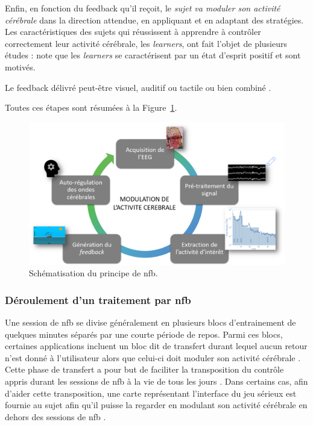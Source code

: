 Enfin, en fonction du feedback qu'il reçoit, le \textit{sujet va moduler son activité cérébrale} dans la direction attendue, en appliquant et en adaptant des stratégies. 
Les caractéristiques des sujets qui réussissent à apprendre à contrôler correctement leur activité cérébrale, les \textit{learners}, ont fait l'objet de plusieurs études : 
\citet{Friedrich2014} note que les \textit{learners} se caractérisent par un état d'esprit positif et sont motivés. 

Le feedback délivré peut-être visuel, auditif ou tactile ou bien combiné \citep{Vernon2004}.

Toutes ces étapes sont résumées à la Figure~\ref{Figure:introduction_nfb_explications}.

\begin{figure}[h!]
  \centering
	\includegraphics[width=1\linewidth]{figures/chapter-1/introduction-nfb-explication} 
  \caption{Schématisation du principe de \gls{nfb}.}
  \label{Figure:introduction_nfb_explications}
\end{figure}

\subsubsection{Déroulement d'un traitement par \gls{nfb}}

Une session de \gls{nfb} se divise généralement en plusieurs blocs d'entrainement de quelques minutes séparés par une courte période de repos.
Parmi ces blocs, certaines applications incluent 
un bloc dit de transfert durant lequel aucun retour n'est donné à l'utilisateur alors que celui-ci doit moduler son activité cérébrale \citep{Bioulac2019,
Bluschke2016, Gani2008, Strehl2006}. Cette phase de transfert a pour but de faciliter la transposition du contrôle appris durant les 
sessions de \gls{nfb} à la vie de tous les jours \citep{Arns2014}. Dans certains cas, afin d'aider cette transposition, une carte représentant l'interface du jeu sérieux est 
fournie au sujet afin qu'il puisse la regarder en modulant son activité cérébrale en dehors des sessions de \gls{nfb} \citep{Leins2007}.

